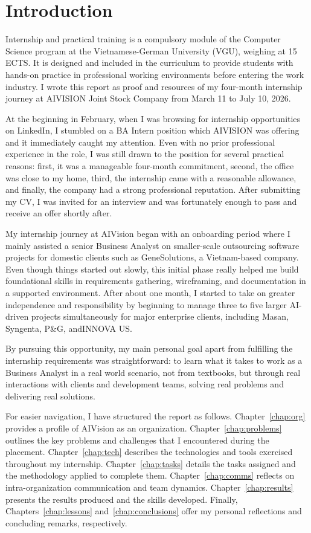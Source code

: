 \chapter{Introduction}

Internship and practical training is a compulsory module of the Computer Science program at the Vietnamese-German University (VGU), weighing at 15 ECTS. It is designed and included in the curriculum to provide students with hands-on practice in professional working environments before entering the work industry. I wrote this report as proof and resources of my four-month internship journey at AIVISION Joint Stock Company from March 11 to July 10, 2026.

At the beginning in February, when I was browsing for internship opportunities on LinkedIn, I stumbled on a BA Intern position which AIVISION was offering and it immediately caught my attention. Even with no prior professional experience in the role, I was still drawn to the position for several practical reasons: first, it was a manageable four-month commitment, second, the office was close to my home, third, the internship came with a reasonable allowance, and finally, the company had a strong professional reputation. After submitting my CV, I was invited for an interview and was fortunately enough to pass and receive an offer shortly after.

My internship journey at AIVision began with an onboarding period where I mainly assisted a senior Business Analyst on smaller-scale outsourcing software projects for domestic clients such as GeneSolutions, a Vietnam-based company. Even though things started out slowly, this initial phase really helped me build foundational skills in requirements gathering, wireframing, and documentation in a supported environment. After about one month, I started to take on greater independence and responsibility by beginning to manage three to five larger AI-driven projects simultaneously for major enterprise clients, including Masan, Syngenta, P\&G, andINNOVA US.

By pursuing this opportunity, my main personal goal apart from fulfilling the internship requirements was straightforward: to learn what it takes to work as a Business Analyst in a real world scenario, not from textbooks, but through real interactions with clients and development teams, solving real problems and delivering real solutions.

For easier navigation, I have structured the report as follows. Chapter~\ref{chap:org} provides a profile of AIVision as an organization. Chapter~\ref{chap:problems} outlines the key problems and challenges that I encountered during the placement. Chapter~\ref{chap:tech} describes the technologies and tools exercised throughout my internship. Chapter~\ref{chap:tasks} details the tasks assigned and the methodology applied to complete them. Chapter~\ref{chap:comms} reflects on intra-organization communication and team dynamics. Chapter~\ref{chap:results} presents the results produced and the skills developed. Finally, Chapters~\ref{chap:lessons} and~\ref{chap:conclusions} offer my personal reflections and concluding remarks, respectively.
